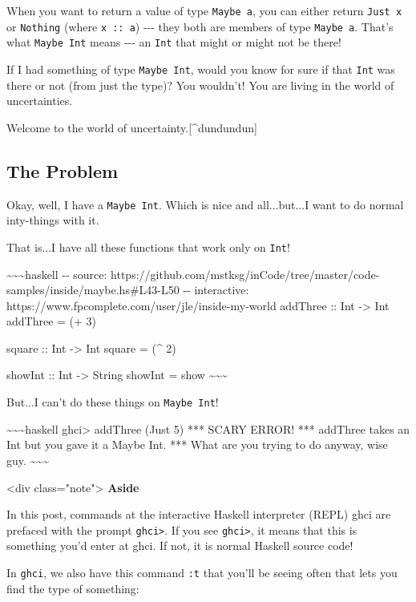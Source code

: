 \documentclass[]{article}
\begin{document}
When you want to return a value of type \texttt{Maybe\ a}, you can either return
\texttt{Just\ x} or \texttt{Nothing} (where \texttt{x\ ::\ a}) -\/-\/- they both
are members of type \texttt{Maybe\ a}. That's what \texttt{Maybe\ Int} means
-\/-\/- an \texttt{Int} that might or might not be there!

If I had something of type \texttt{Maybe\ Int}, would you know for sure if that
\texttt{Int} was there or not (from just the type)? You wouldn't! You are living
in the world of uncertainties.

Welcome to the world of uncertainty.{[}\^{}dundundun{]}

\subsection{The Problem}

Okay, well, I have a \texttt{Maybe\ Int}. Which is nice and all...but...I want
to do normal inty-things with it.

That is...I have all these functions that work only on \texttt{Int}!

\textasciitilde{}\textasciitilde{}\textasciitilde{}haskell -\/- source:
https://github.com/mstksg/inCode/tree/master/code-samples/inside/maybe.hs\#L43-L50
-\/- interactive: https://www.fpcomplete.com/user/jle/inside-my-world addThree
:: Int -\textgreater{} Int addThree = (+ 3)

square :: Int -\textgreater{} Int square = (\^{} 2)

showInt :: Int -\textgreater{} String showInt = show
\textasciitilde{}\textasciitilde{}\textasciitilde{}

But...I can't do these things on \texttt{Maybe\ Int}!

\textasciitilde{}\textasciitilde{}\textasciitilde{}haskell ghci\textgreater{}
addThree (Just 5) *** SCARY ERROR! *** addThree takes an Int but you gave it a
Maybe Int. *** What are you trying to do anyway, wise guy.
\textasciitilde{}\textasciitilde{}\textasciitilde{}

\textless{}div class="note"\textgreater{} \textbf{Aside}

In this post, commands at the interactive Haskell interpreter (REPL) ghci are
prefaced with the prompt \texttt{ghci\textgreater{}}. If you see
\texttt{ghci\textgreater{}}, it means that this is something you'd enter at
ghci. If not, it is normal Haskell source code!

In \texttt{ghci}, we also have this command \texttt{:t} that you'll be seeing
often that lets you find the type of something:
\end{document}
